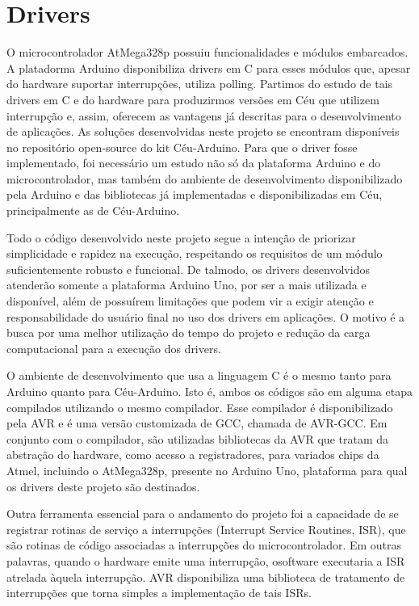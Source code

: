 \documentclass[11pt]{article}
\begin{document}
\section{Drivers}
\tab O microcontrolador AtMega328p possuiu funcionalidades e módulos embarcados. A platadorma Arduino disponibiliza drivers em C para esses módulos que, apesar do hardware suportar interrupções, utiliza polling. Partimos do estudo de tais drivers em C e do hardware para produzirmos versões em Céu que utilizem interrupção e, assim, oferecem as vantagens já descritas para o desenvolvimento de aplicações. As soluções desenvolvidas neste projeto se encontram disponíveis no repositório open-source do kit Céu-Arduino. Para que o driver fosse implementado, foi necessário um estudo não só da plataforma Arduino e do microcontrolador, mas também do ambiente de desenvolvimento disponibilizado pela Arduino e das bibliotecas já implementadas e disponibilizadas em Céu, principalmente as de Céu-Arduino.
\par Todo o código desenvolvido neste projeto segue a intenção de priorizar simplicidade e rapidez na execução, respeitando os requisitos de um módulo suficientemente robusto e funcional. De talmodo, os drivers desenvolvidos atenderão somente a plataforma Arduino Uno, por ser a mais utilizada e disponível, além de possuírem limitações que podem vir a exigir atenção e responsabilidade do usuário final no uso dos drivers em aplicações. O motivo é a busca por uma melhor utilização do tempo do projeto e redução da carga computacional para a execução dos drivers.
\par O ambiente de desenvolvimento que usa a linguagem C é o mesmo tanto para Arduino quanto para Céu-Arduino. Isto é, ambos os códigos são em alguma etapa compilados utilizando o mesmo compilador. Esse compilador é disponibilizado pela AVR e é uma versão customizada de GCC, chamada de AVR-GCC. Em conjunto com o compilador, são utilizadas bibliotecas da AVR que tratam da abstração do hardware, como acesso a registradores, para variados chips da Atmel, incluindo o AtMega328p, presente no Arduino Uno, plataforma para qual os drivers deste projeto são destinados.
\par Outra ferramenta essencial para o andamento do projeto foi a capacidade de se registrar rotinas de serviço a interrupções (Interrupt Service Routines, ISR), que são rotinas de código associadas a interrupções do microcontrolador. Em outras palavras, quando o hardware emite uma interrupção, osoftware executaria a ISR atrelada àquela interrupção. AVR disponibiliza uma biblioteca de tratamento de interrupções que torna simples a implementação de tais ISRs.
\end{document}
